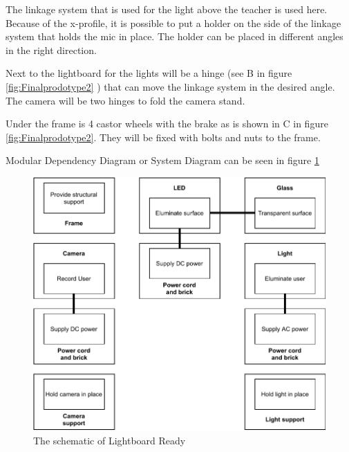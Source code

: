\documentclass[a4paper]{jpconf}
\begin{document}
	\textbf{} The linkage system that is used for the light above the teacher is used here.
	Because of the x-profile, it is possible to put a holder on the side of the linkage system that holds the mic in place.
	The holder can be placed in different angles in the right direction.
	
	\textbf{} Next to the lightboard for the lights will be a hinge (see B in figure \ref{fig:Finalprodotype2} ) that can move the linkage system in the desired angle.
	The camera will be two hinges to fold the camera stand.
	
	\textbf{} Under the frame is 4 castor wheels with the brake as is shown in C in figure \ref{fig:Finalprodotype2}.
	They will be fixed with bolts and nuts to the frame.
	
	Modular Dependency Diagram or System Diagram can be seen in figure \ref{fig:scematic}
	\begin{figure}
		\centering
		\includegraphics[width=0.7\linewidth]{scematic.pdf}
		\caption{The schematic of Lightboard Ready}
		\label{fig:scematic}
	\end{figure}
	
\end{document}

